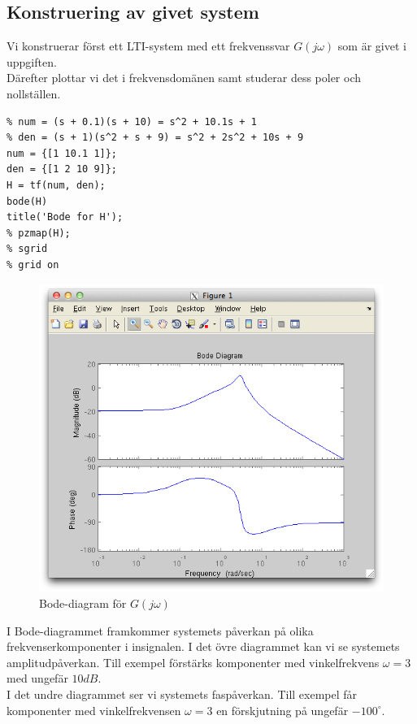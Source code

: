 \documentclass[]{article}
\begin{document}
\subsection{Konstruering av givet system} %
\label{sub:konstruering_av_givet_system}
Vi konstruerar först ett LTI-system med ett frekvenssvar $G(j\omega)$ som är givet i uppgiften. \\
Därefter plottar vi det i frekvensdomänen samt studerar dess poler och nollställen.
\begin{verbatim}
% num = (s + 0.1)(s + 10) = s^2 + 10.1s + 1
% den = (s + 1)(s^2 + s + 9) = s^2 + 2s^2 + 10s + 9
num = {[1 10.1 1]};
den = {[1 2 10 9]};
H = tf(num, den);
bode(H)
title('Bode for H');
% pzmap(H);
% sgrid
% grid on
\end{verbatim}
\begin{figure}[htb]
  \centering
  \includegraphics[width=15.0cm]{bode.png}
  \caption{Bode-diagram för $G(j\omega)$}
\end{figure}
I Bode-diagrammet framkommer systemets påverkan på olika frekvenserkomponenter i insignalen. I det övre diagrammet kan vi se systemets amplitudpåverkan. Till exempel förstärks komponenter med vinkelfrekvens $\omega = 3$ med ungefär $10dB$. \\
I det undre diagrammet ser vi systemets faspåverkan. Till exempel får komponenter med vinkelfrekvensen $\omega = 3$ en förskjutning på ungefär $-100^\circ$.
\end{document}
